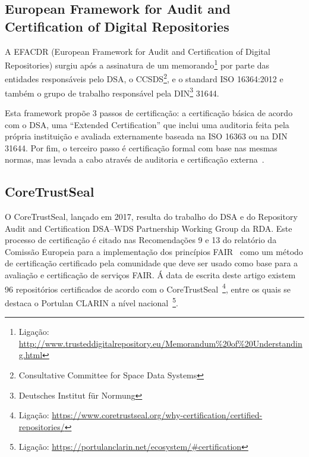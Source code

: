 \documentclass[sigconf,nonacm]{acmart}
\begin{document}

\subsection{European Framework for Audit and Certification of Digital Repositories} %
\label{sub:european_framework_for_audit_and_certification_of_digital_repositories}

A EFACDR (European Framework for Audit and Certification of Digital Repositories) surgiu após a assinatura de um memorando\footnote{Ligação: \url{http://www.trusteddigitalrepository.eu/Memorandum\%20of\%20Understanding.html}} por parte das entidades responsáveis pelo DSA, o CCSDS\footnote{Consultative Committee for Space Data Systems}, e o standard ISO 16364:2012 e também o grupo de trabalho responsável pela DIN\footnote{Deutsches Institut für Normung} 31644. 

Esta framework propõe 3 passos de certificação: a certificação básica de acordo com o DSA, uma ``Extended Certification'' que inclui uma auditoria feita pela própria instituição e avaliada externamente baseada na ISO 16363 ou na DIN 31644. Por fim, o terceiro passo é certificação formal com base nas mesmas normas, mas levada a cabo através de auditoria e certificação externa~\cite{Lindlar_Schwab_2019}.


\subsection{CoreTrustSeal} %
\label{sub:core_trust_seal}

O CoreTrustSeal, lançado em 2017, resulta do trabalho do DSA e do Repository Audit and Certification DSA–WDS Partnership Working Group da RDA. 
%
Este processo de certificação é citado nas Recomendações 9 e 13 do relatório da Comissão Europeia para a implementação dos princípios FAIR~\cite{hodson2018turning} como um método de certificação certificado pela comunidade que deve ser usado como base para a avaliação e certificação de serviços FAIR. 
%
Á data de escrita deste artigo existem 96 repositórios certificados de acordo com o CoreTrustSeal~\footnote{Ligação: \url{https://www.coretrustseal.org/why-certification/certified-repositories/}}, entre os quais se destaca o Portulan CLARIN a nível nacional~\footnote{Ligação: \url{https://portulanclarin.net/ecosystem/\#certification}}.
\end{document}
